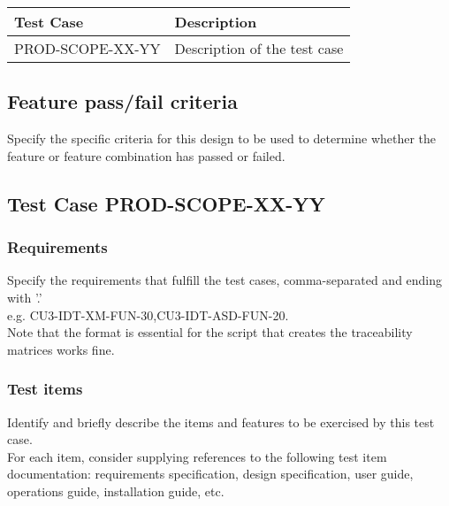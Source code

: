 \documentclass[DM,lsstdraft,STS,toc]{lsstdoc}
\def\product{PROD}
\begin{document}
\begin{longtable} {|p{}|p{}|}\hline
{\bf Test Case}  & {\bf Description}  \\\hline
\product-SCOPE-XX-YY &
Description of the test case \\\hline
\end{longtable}

\subsection{Feature pass/fail criteria \label{sect:passfail}}
Specify the specific criteria for this design to be used to determine whether the feature or feature combination has passed or failed.





\subsection{Test Case \product-SCOPE-XX-YY \label{sect:testcaseid}}

\subsubsection{Requirements \label{sect:reqs}}
Specify the requirements that fulfill the test cases, comma-separated and ending with '.'\\
e.g. CU3-IDT-XM-FUN-30,CU3-IDT-ASD-FUN-20.\\
Note that the format is essential for the script that creates the traceability matrices works fine.

\subsubsection{Test items \label{sect:tcitems}}
Identify and briefly describe the items and features to be exercised by this test case.\\
For each item, consider supplying references to the following test item documentation: requirements specification, design
specification, user guide, operations guide, installation guide, etc.
\end{document}
